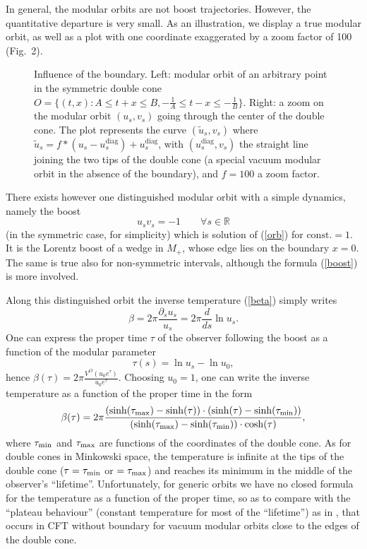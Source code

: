 \documentclass[12pt]{article}
\def \RR {{\mathbb R}}
\def\const{\mathrm{const.}}
\def\be{\begin{equation}} \def\bea{\begin{eqnarray}}
\def\ee{\end{equation}}\def\ea{\end{array}}
\begin{document}
In general, the modular orbits are not boost trajectories. However,
the quantitative departure is very small. As an illustration, we
display a true modular orbit, as well as a plot with one coordinate
exaggerated by a zoom factor of 100 (Fig.\ 2).

\begin{figure}[htb*]
\hskip18mm  
\caption{\small Influence of the boundary. Left: modular orbit of an
  arbitrary point in the symmetric double cone $O=\{(t,x):A\leq t+x\leq
  B, -\frac1A\leq t-x\leq -\frac1B\}$. Right: a zoom on the modular
  orbit $(u_s, v_s)$ going through the center of the double cone. The
  plot represents the curve $(\tilde{u}_s,v_s)$ where $\tilde{u}_s =
  f*(u_s - u^{\text{diag}}_s) +u^{\text{diag}}_s$, with
  $(u^{\text{diag}}_s, v_s)$ the straight line joining the two tips of
  the double cone (a special vacuum modular orbit in the absence of
  the boundary), and $f=100$ a zoom factor.} 
\end{figure}

There exists however one distinguished modular orbit with a simple
dynamics, namely the boost  
\be
\label{boost}
  u_s v_s= -1  \qquad \forall s\in\RR 
\ee
(in the symmetric case, for simplicity) which is solution of
(\ref{orb}) for $\const =1$. It is the Lorentz boost of a wedge in
$M_+$, whose edge lies on the boundary $x=0$. The same is true also
for non-symmetric intervals, although the formula (\ref{boost}) is
more involved.

Along this distinguished orbit the inverse temperature (\ref{beta})
simply writes  
\be
\label{eq:15}
  \beta = 2\pi \frac{\partial_s u_s}{u_s} = 2\pi\frac{d}{ds}\ln u_s. 
\ee
One can express the proper time $\tau$ of the observer following the
boost as a function of the modular parameter 
\be
   \tau(s) = \ln u_s - \ln u_0,
\ee
hence $\beta(\tau) = 2\pi\frac{V^O(u_0 e^\tau)}{u_0 e^\tau}$. Choosing
$u_0=1$, one can write the inverse temperature as a function of the
proper time in the form
\be
   \beta(\tau)  =  2\pi\frac{(\sinh(\tau_{\rm  max})-\sinh(\tau))\cdot 
  (\sinh(\tau)-\sinh(\tau_{\rm min}))}
  {(\sinh(\tau_{\rm max})-\sinh(\tau_{\rm min}))\cdot \cosh(\tau)},
\ee
where $\tau_{\rm min}$ and $\tau_{\rm max}$ are functions of the
coordinates of the double cone. As for double cones in Minkowski
space, the temperature is infinite at the tips of the double cone
($\tau=\tau_{\rm min}$ or $=\tau_{\rm  max}$) and reaches its minimum
in the middle of the observer's ``lifetime''. Unfortunately, for
generic orbits we have no closed formula for the temperature as a
function of the proper time, so as to compare with the ``plateau
behaviour'' (constant temperature for most of the ``lifetime'') as in
\cite{MR}, that occurs in CFT without boundary for vacuum modular
orbits close to the edges of the double cone.  
\end{document}
